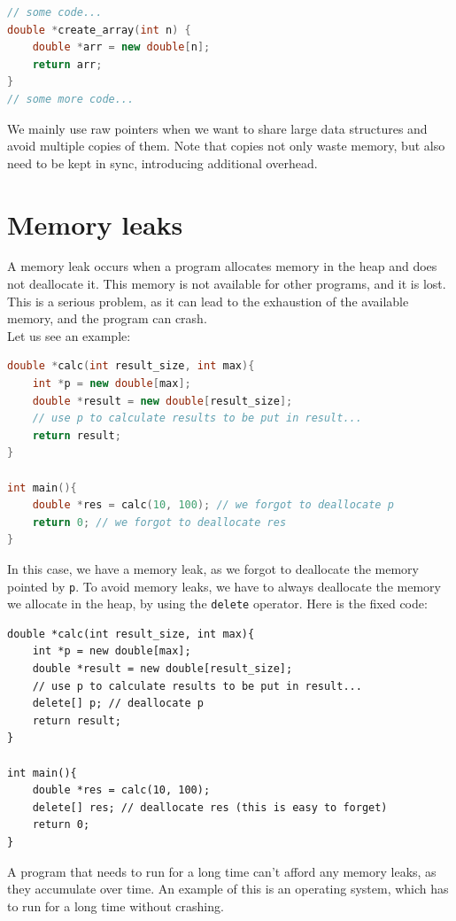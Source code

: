 \begin{lstlisting}[language=C++]
// some code...
double *create_array(int n) {
    double *arr = new double[n];
    return arr;
}
// some more code...
\end{lstlisting}

We mainly use raw pointers when we want to share large data structures and avoid multiple copies of them. Note that copies not only waste
memory, but also need to be kept in sync, introducing additional overhead.

\section{Memory leaks}

A memory leak occurs when a program allocates memory in the heap and does not deallocate it. This memory is not available for
other programs, and it is lost. This is a serious problem, as it can lead to the exhaustion of the available memory, and the program
can crash.\\

Let us see an example:

\begin{lstlisting}[language=C++]
double *calc(int result_size, int max){
    int *p = new double[max];
    double *result = new double[result_size];
    // use p to calculate results to be put in result...
    return result;
}

int main(){
    double *res = calc(10, 100); // we forgot to deallocate p
    return 0; // we forgot to deallocate res
}
\end{lstlisting}

In this case, we have a memory leak, as we forgot to deallocate the memory pointed by \texttt{p}. To avoid memory leaks, we have to
always deallocate the memory we allocate in the heap, by using the \texttt{delete} operator. Here is the fixed code:\\

\begin{lstlisting}
double *calc(int result_size, int max){
    int *p = new double[max];
    double *result = new double[result_size];
    // use p to calculate results to be put in result...
    delete[] p; // deallocate p
    return result;
}

int main(){
    double *res = calc(10, 100);
    delete[] res; // deallocate res (this is easy to forget)
    return 0;
}
\end{lstlisting}

A program that needs to run for a long time can't afford any memory leaks, as they accumulate over time. An example of
this is an operating system, which has to run for a long time without crashing.\\

